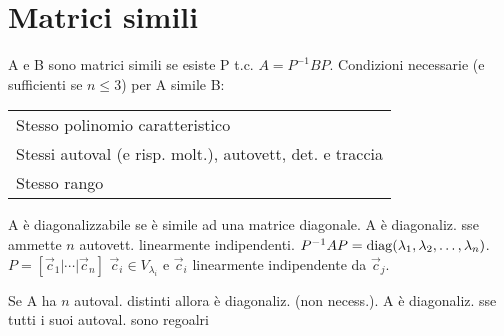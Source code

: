 \section{Matrici simili}

A e B sono matrici simili se esiste P t.c. $A = P^{-1}BP$. Condizioni necessarie (e sufficienti se $n \le 3$) per A simile B:

\begin{tabular}{l}
	Stesso polinomio caratteristico \\
	Stessi autoval (e risp. molt.), autovett, det. e traccia \\
	Stesso rango
\end{tabular}

A è diagonalizzabile se è simile ad una matrice diagonale. A è diagonaliz. sse ammette $n$ autovett. linearmente indipendenti. $P^{-1}AP = \mathrm{diag}(\lambda_1, \lambda_2, \dots, \lambda_n)$. $P=[ \vec{c}_1 | \cdots | \vec{c}_n ]$ $\vec{c}_i \in V_{\lambda_i}$ e $\vec{c}_i$ linearmente indipendente da $\vec{c}_j$.

Se A ha $n$ autoval. distinti allora è diagonaliz. (non necess.). A è diagonaliz. sse tutti i suoi autoval. sono regoalri
